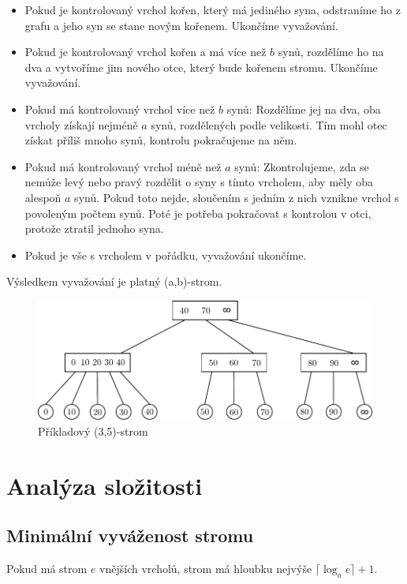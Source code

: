\documentclass[a4paper,11pt,openany]{article}
\begin{document}
\begin{itemize}
	\item
	Pokud je kontrolovaný vrchol kořen, který má jediného syna, odstraníme ho z grafu a jeho syn se stane novým kořenem. Ukončíme vyvažování.
	\item
	Pokud je kontrolovaný vrchol kořen a má více než $b$ synů, rozdělíme ho na dva a vytvoříme jim nového otce, který bude kořenem stromu. Ukončíme vyvažování.
	\item
	Pokud má kontrolovaný vrchol více než $b$ synů: Rozdělíme jej na dva, oba vrcholy získají nejméně $a$ synů, rozdělených podle velikosti. Tím mohl otec získat příliš mnoho synů, kontrolu pokračujeme na něm.
	\item
	Pokud má kontrolovaný vrchol méně než $a$ synů: Zkontrolujeme, zda se nemůže levý nebo pravý rozdělit o syny s tímto vrcholem, aby měly oba alespoň $a$ synů. Pokud toto nejde, sloučením s jedním z nich vznikne vrchol s povoleným počtem synů. Poté je potřeba pokračovat s kontrolou v otci, protože ztratil jednoho syna.
	\item
	Pokud je vše s vrcholem v pořádku, vyvažování ukončíme.
\end{itemize}

Výsledkem vyvažování je platný (a,b)-strom.

\begin{figure}
	\centering
	\includegraphics{pics/drawing.pdf}
	\caption{Příkladový (3,5)-strom}
\end{figure}

\section{Analýza složitosti}

\subsection{Minimální vyváženost stromu}

Pokud má strom $e$ vnějších vrcholů, strom má hloubku nejvýše $\lceil\log_a e\rceil + 1$.
\end{document}
